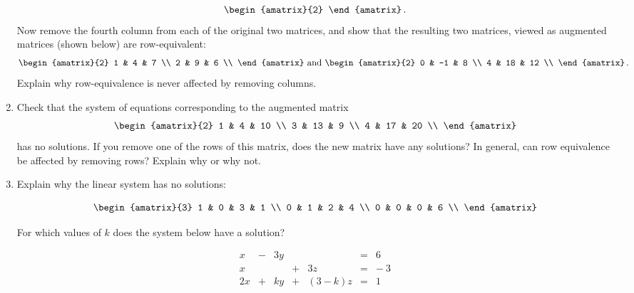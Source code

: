 \begin{enumerate}
\[\begin{amatrix}{2}
\end{amatrix}\, .
\]
Now remove the fourth column from each of the original two matrices, and show that the resulting two matrices, viewed as augmented matrices (shown below) are row-equivalent:
\[
\begin{amatrix}{2}
1 & 4 & 7 \\
2 & 9 & 6 \\
\end{amatrix}
\mbox{ and }
\begin{amatrix}{2}
0 & -1 & 8 \\
4 & 18 & 12 \\
\end{amatrix}\, .
\]
Explain why row-equivalence is never affected by removing columns.


\item Check that the system of equations corresponding to the augmented matrix
$$\begin{amatrix}{2}
1 & 4 & 10 \\
3 & 13 & 9 \\
4 & 17 & 20 \\
\end{amatrix}$$
has no solutions. If you remove one of the rows of this matrix, does the new matrix have any solutions? In general, can row equivalence be affected by removing rows? Explain why or why not.


\item \label{Ihavenoslons} 
Explain why the linear system has no solutions:

\[\begin{amatrix}{3}
1 & 0 & 3 & 1 \\
0 & 1 & 2 & 4 \\
0 & 0 & 0 & 6 \\
\end{amatrix}\]

For which values of $k$ does the system below have a solution?

    \begin{equation*}
      \begin{array}{rrrrrrr}
            x   &  -& 3y   & & &=  & 6  \\
            x   &  & &+& 3 z   &=  & -\ 3 \\
            2x  &  +& ky &  +&\!\! (3-k)z   &=  &1  
      \end{array}
    \end{equation*}


\end{enumerate}
